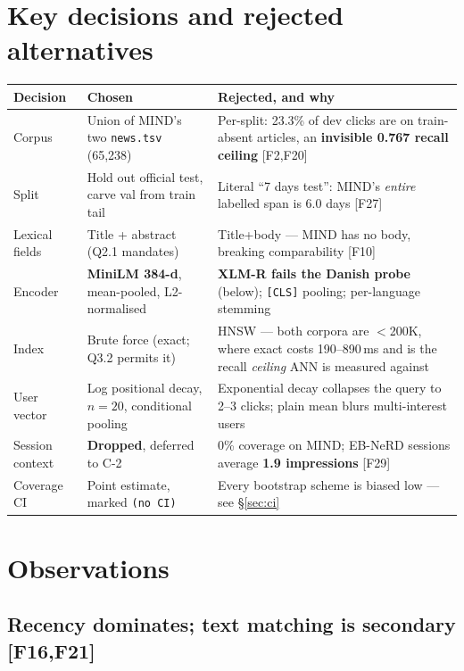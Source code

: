 \documentclass[10pt,a4paper]{article}
\newcommand{\F}[1]{\textcolor{blue!55!black}{\footnotesize[#1]}}
\begin{document}
\section{Key decisions and rejected alternatives}

\begin{center}\footnotesize
\begin{tabular}{@{}p{2.4cm}p{5.4cm}p{9.3cm}@{}}
\toprule
\textbf{Decision} & \textbf{Chosen} & \textbf{Rejected, and why} \\
\midrule
Corpus & Union of MIND's two \texttt{news.tsv} (65,238) & Per-split: 23.3\% of dev clicks are on train-absent articles, an \textbf{invisible 0.767 recall ceiling} \F{F2,F20} \\
Split & Hold out official test, carve val from train tail & Literal ``7 days test'': MIND's \emph{entire} labelled span is 6.0 days \F{F27} \\
Lexical fields & Title + abstract (Q2.1 mandates) & Title+body --- MIND has no body, breaking comparability \F{F10} \\
Encoder & \textbf{MiniLM 384-d}, mean-pooled, L2-normalised & \textbf{XLM-R fails the Danish probe} (below); \texttt{[CLS]} pooling; per-language stemming \\
Index & Brute force (exact; Q3.2 permits it) & HNSW --- both corpora are $<$200K, where exact costs 190--890\,ms and is the recall \emph{ceiling} ANN is measured against \\
User vector & Log positional decay, $n{=}20$, conditional pooling & Exponential decay collapses the query to 2--3 clicks; plain mean blurs multi-interest users \\
Session context & \textbf{Dropped}, deferred to C-2 & 0\% coverage on MIND; EB-NeRD sessions average \textbf{1.9 impressions} \F{F29} \\
Coverage CI & Point estimate, marked \texttt{(no CI)} & Every bootstrap scheme is biased low --- see \S\ref{sec:ci} \\
\bottomrule
\end{tabular}
\end{center}

\section{Observations}

\subsection{Recency dominates; text matching is secondary \F{F16,F21}}
\end{document}
